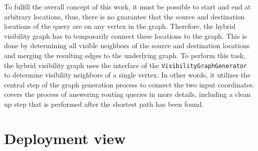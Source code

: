 	To fulfill the overall concept of this work, it must be possible to start and end at arbitrary locations, thus, there is no guarantee that the source and destination locations of the query are on any vertex in the graph.
	Therefore, the hybrid visibility graph has to temporarily connect these locations to the graph.
	This is done by determining all visible neighbors of the source and destination locations and merging the resulting edges to the underlying graph.
	To perform this task, the hybrid visibility graph uses the interface of the \texttt{VisibilityGraphGenerator} to determine visibility neighbors of a single vertex.
	In other words, it utilizes the central step of the graph generation process to connect the two input coordinates.
	 covers the process of answering routing queries in more details, including a clean up step that is performed after the shortest path has been found.

\section{Deployment view}


